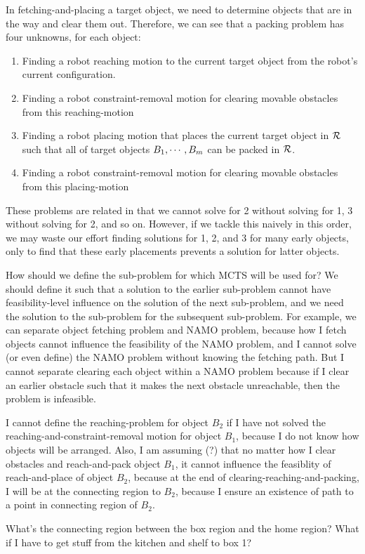 \documentclass[10pt,letterpaper]{article}
\begin{document}
In fetching-and-placing a target object, we need to determine
objects that are in the way and clear them out. 
Therefore, we can see that a packing problem has
four unknowns, for each object:
\begin{enumerate}
\item Finding a robot reaching motion to the current target object
from the robot's current configuration. 
\item Finding a robot constraint-removal motion for clearing movable obstacles
from this reaching-motion
\item Finding a robot placing motion that places the current target
object in $\mathcal{R}$ such that all of target objects $B_1,\cdots,B_m$ can
be packed in $\mathcal{R}$.
\item Finding a robot constraint-removal motion for clearing movable obstacles
from this placing-motion
\end{enumerate}

These problems are related in that we cannot solve for 2 without solving for
1, 3 without solving for 2, and so on. However, if we tackle this naively in this 
order, we may waste our effort finding solutions 
for 1, 2, and 3 for many early objects, only to find 
that these early placements prevents a solution for latter objects. 


How should we define the sub-problem for which MCTS will be used for?
We should define it such that a solution to the earlier sub-problem
cannot have feasibility-level influence on the solution of the
next sub-problem, and we need the solution to the sub-problem
for the subsequent sub-problem. For example, we can separate object
fetching problem and NAMO problem, because how I fetch objects
cannot influence the feasibility of the NAMO problem, and
I cannot solve (or even define) the NAMO problem without knowing the fetching path.
But I cannot separate clearing each object within a NAMO problem
because if I clear an earlier obstacle such that it makes the
next obstacle unreachable, then the problem is infeasible.


I cannot define the reaching-problem for object $B_2$ if I have not
solved the reaching-and-constraint-removal motion for object $B_1$,
because I do not know how objects will be arranged. Also, I am assuming (?)
that no matter how I clear obstacles and reach-and-pack object $B_1$,
it cannot influence the feasiblity of reach-and-place of object $B_2$,
because at the end of clearing-reaching-and-packing, I will be at the
connecting region to $B_2$, because I ensure an existence of path
to a point in connecting region of $B_2$.

What's the connecting region between the box region and the home region?
What if I have to get stuff from the kitchen and shelf to box 1?






\end{document}
